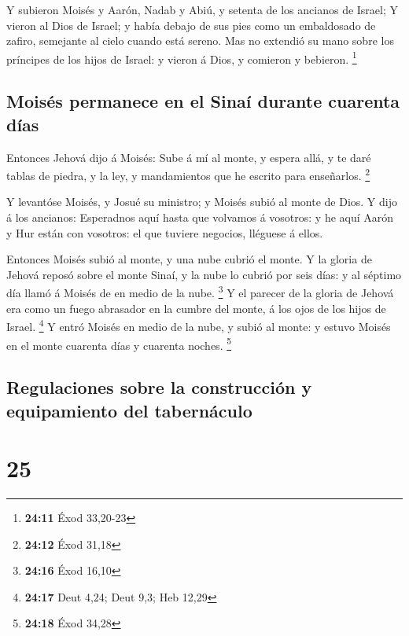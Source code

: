 Y subieron Moisés y Aarón, Nadab y Abiú, y setenta de los
ancianos de Israel;  Y vieron al Dios de Israel; y había
debajo de sus pies como un embaldosado de zafiro, semejante al cielo
cuando está sereno.  Mas no extendió su mano sobre los
príncipes de los hijos de Israel: y vieron á Dios, y comieron y
bebieron. \footnote{\textbf{24:11} Éxod 33,20-23}

\hypertarget{moisuxe9s-permanece-en-el-sinauxed-durante-cuarenta-duxedas}{%
\subsection{Moisés permanece en el Sinaí durante cuarenta
días}\label{moisuxe9s-permanece-en-el-sinauxed-durante-cuarenta-duxedas}}

 Entonces Jehová dijo á Moisés: Sube á mí al monte, y
espera allá, y te daré tablas de piedra, y la ley, y mandamientos que he
escrito para enseñarlos. \footnote{\textbf{24:12} Éxod 31,18}

 Y levantóse Moisés, y Josué su ministro; y Moisés subió
al monte de Dios.  Y dijo á los ancianos: Esperadnos aquí
hasta que volvamos á vosotros: y he aquí Aarón y Hur están con vosotros:
el que tuviere negocios, lléguese á ellos.

 Entonces Moisés subió al monte, y una nube cubrió el
monte.  Y la gloria de Jehová reposó sobre el monte
Sinaí, y la nube lo cubrió por seis días: y al séptimo día llamó á
Moisés de en medio de la nube. \footnote{\textbf{24:16} Éxod 16,10}
 Y el parecer de la gloria de Jehová era como un fuego
abrasador en la cumbre del monte, á los ojos de los hijos de Israel.
\footnote{\textbf{24:17} Deut 4,24; Deut 9,3; Heb 12,29} 
Y entró Moisés en medio de la nube, y subió al monte: y estuvo Moisés en
el monte cuarenta días y cuarenta noches. \footnote{\textbf{24:18} Éxod
  34,28}

\hypertarget{regulaciones-sobre-la-construcciuxf3n-y-equipamiento-del-tabernuxe1culo}{%
\subsection{Regulaciones sobre la construcción y equipamiento del
tabernáculo}\label{regulaciones-sobre-la-construcciuxf3n-y-equipamiento-del-tabernuxe1culo}}

\hypertarget{section-24}{%
\section{25}\label{section-24}}

